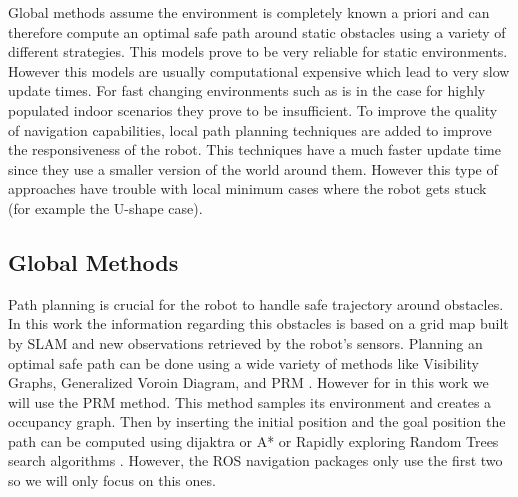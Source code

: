  
 Global methods assume the environment is completely known a priori and can therefore compute an optimal safe path  around static obstacles using a variety of different strategies. This models prove to be very reliable for static environments. However this models are usually computational expensive which lead to very slow update times. For fast changing environments such as is in the case for highly populated indoor scenarios they prove to be insufficient. 
 To improve the quality of navigation capabilities, local path planning techniques are added to improve the responsiveness of the robot. This techniques have a much faster update time  since they use a smaller version of the world around them. However this type of approaches have trouble with local minimum cases where the robot gets stuck (for example the U-shape case).
\subsection{Global Methods}
Path planning is crucial for the robot to handle safe trajectory around obstacles. In this work the information regarding this obstacles is based on a grid map built by \ac{SLAM} and new observations retrieved by the robot's sensors.  Planning an optimal safe path can be done using a wide variety of methods like Visibility Graphs, Generalized Voroin Diagram, and \ac{PRM} \cite{globalmethods}. However for in this work we will use the \ac{PRM} method. This method samples its environment and creates a occupancy graph. Then by inserting the initial position and the goal position the path can be computed using dijaktra or A* or Rapidly exploring Random Trees search algorithms . However, the \ac{ROS} navigation packages only use the first two so  we will only focus on this ones.


